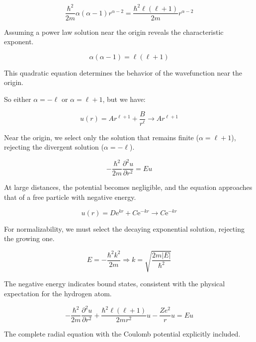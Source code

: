 \begin{equation}
\frac{\hbar^{2}}{2 m} \alpha(\alpha-1) r^{\alpha-2}=\frac{\hbar^{2} \ell(\ell+1)}{2 m} r^{\alpha-2}
\end{equation}

Assuming a power law solution near the origin reveals the characteristic exponent.

\begin{equation}
\alpha(\alpha-1)=\ell(\ell+1)
\end{equation}

This quadratic equation determines the behavior of the wavefunction near the origin.

So either $\alpha=-\ell$ or $\alpha=\ell+1$, but we have:

\begin{equation}
u(r)=A r^{\ell+1}+\frac{B}{r^{\ell}} \rightarrow A r^{\ell+1}
\end{equation}

Near the origin, we select only the solution that remains finite ($\alpha=\ell+1$), rejecting the divergent solution ($\alpha=-\ell$).

\begin{equation}
-\frac{\hbar^{2}}{2 m} \frac{\partial^{2} u}{\partial r^{2}}=E u
\end{equation}

At large distances, the potential becomes negligible, and the equation approaches that of a free particle with negative energy.

\begin{equation}
u(r)=D \mathrm{e}^{k r}+C \mathrm{e}^{-k r} \rightarrow C \mathrm{e}^{-k r}
\end{equation}

For normalizability, we must select the decaying exponential solution, rejecting the growing one.

\begin{equation}
E=-\frac{\hbar^{2} k^{2}}{2 m} \Longrightarrow k=\sqrt{\frac{2 m|E|}{\hbar^{2}}}
\end{equation}

The negative energy indicates bound states, consistent with the physical expectation for the hydrogen atom.

\begin{equation}
-\frac{\hbar^{2}}{2 m} \frac{\partial^{2} u}{\partial r^{2}}+\frac{\hbar^{2} \ell(\ell+1)}{2 m r^{2}} u-\frac{Z e^{2}}{r} u=E u
\end{equation}

The complete radial equation with the Coulomb potential explicitly included.

